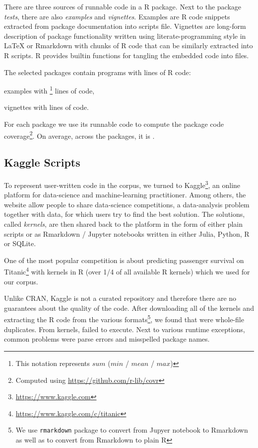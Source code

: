 \documentclass[conference]{IEEEtran}
\begin{document}
There are three sources of runnable code in a R package. Next to the package
\emph{tests}, there are also \emph{examples} and \emph{vignettes}. Examples are
R code snippets extracted from package documentation into scripts file.
Vignettes are long-form description of package functionality written using
literate-programming style in \LaTeX\xspace or Rmarkdown with chunks of R code
that can be similarly extracted into R scripts. R provides builtin functions for
tangling the embedded code into files.

The selected packages contain \CorpusPackagePrograms programs with
\CorpusPackageProgramsCodeRnd lines of R code:
%
\begin{compactitem}[$-$]
  \item \CorpusExamplesProgramsRnd examples with
  \footnote{This notation represents $sum$ ($min$
    / $mean$ / $max$)} lines of code,
  \item \CorpusVignettesProgramsRnd vignettes with
   lines of code.
\end{compactitem}

For each package we use its runnable code to compute the package code
coverage\footnote{Computed using \url{ https://github.com/r-lib/covr}}. On
average, across the \CorpusPackages packages, it is \CorpusMeanExprCoverage.

\subsection{Kaggle Scripts}

To represent user-written code in the corpus, we turned to
Kaggle\footnote{\url{https://www.kaggle.com}}, an online platform for
data-science and machine-learning practitioner. Among others, the website allow
people to share data-science competitions, a data-analysis problem together with
data, for which users try to find the best solution. The solutions, called
\emph{kernels}, are then shared back to the platform in the form of either plain
scripts or as Rmarkdown / Jupyter notebooks written in either Julia, Python, R
or SQLite.

One of the most popular competition is about predicting passenger survival on
Titanic\footnote{\url{https://www.kaggle.com/c/titanic}} with \CorpusKaggle
kernels in R (over 1/4 of all available R kernels) which we used for our corpus.

Unlike CRAN, Kaggle is not a curated repository and therefore there are no
guarantees about the quality of the code. After downloading all of the
\CorpusKaggle kernels and extracting the R code from the various
formats\footnote{We use \texttt{rmarkdown} package to convert from Jupyer
  notebook to Rmarkdown as well as to convert from Rmarkdown to plain R}, we
found that \CorpusDuplicatedKaggle were whole-file duplicates. From
\CorpusRunnableKaggle kernels, \CorpusFailedKaggle failed to execute. Next to
various runtime exceptions, common problems were parse errors and misspelled
package names.
\end{document}
